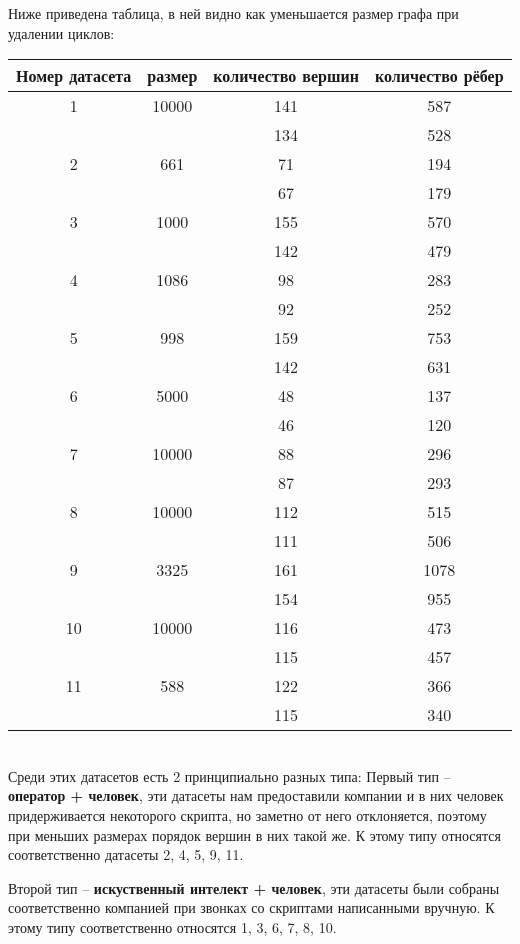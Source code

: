 \documentclass[specification,annotation]{itmo-student-thesis}
\begin{document}
	Ниже приведена таблица, в ней видно как уменьшается размер графа при удалении циклов:\\
	
	\begin{tabular}{|c|c|c|c|}
	\hline
	Номер датасета & размер & количество вершин & количество рёбер\\
	\hline
	1&10000 & 141 & 587\\%
	&		& 134 & 528\\ %
	\hline
	2&661&71&194\\ %
	 &   &67&179\\
	\hline
	3&1000&155&570\\ %
	 &    &142&479\\
	\hline
	4&1086&98&283\\ %
	 &    &92&252\\
	\hline
	5&998&159&753\\
	 &   &142&631\\ %
	\hline
	6&5000&48&137\\ %
	 &    &46&120\\
	\hline
	7&10000&88&296\\%
	 &     &87&293\\
	\hline
	8&10000&112&515\\%
	 &     &111&506\\
	\hline
	9&3325&161&1078\\
	 &    &154&955\\ %
	\hline
	10&10000&116&473\\
	  &     &115&457\\ %
	\hline
	11&588&122&366\\
	  &   &115&340\\ %
	\hline
	
	\end{tabular}\\

	Среди этих датасетов есть 2 принципиально разных типа:
	Первый тип -- \textbf{оператор + человек}, эти датасеты нам предоставили компании и в них человек придерживается некоторого скрипта, но заметно от него отклоняется, поэтому при меньших размерах порядок вершин в них такой же. К этому типу относятся соответственно датасеты 2, 4, 5, 9, 11.
	
	Второй тип -- \textbf{искуственный интелект + человек}, эти датасеты были собраны соответственно компанией при звонках со скриптами написанными вручную. К этому типу соответственно относятся 1, 3, 6, 7, 8, 10.
	
\end{document}

